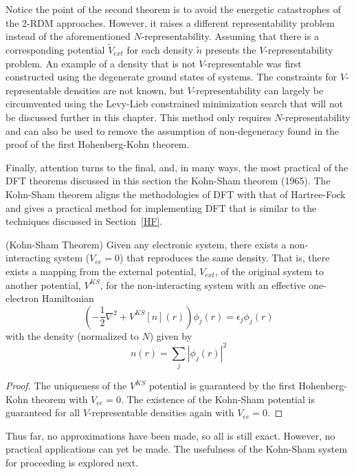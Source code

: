 \documentclass[11pt,oneside,final]{huthesis}%
\begin{document}
Notice the point of the second theorem is to avoid the energetic catastrophes    of the 2-RDM approaches.  However, it raises a different representability problem instead of the aforementioned $N$-representability.  Assuming that there is a corresponding potential $\tilde{V}_{ext}$ for each density $\tilde{n}$ presents the $V$-representability problem.  An example of a density that is not $V$-representable was first constructed using the degenerate ground states of systems.  The constraints for $V$-representable densities are not known, but $V$-representability can largely be circumvented using the Levy-Lieb constrained minimization search that will not be discussed further in this chapter. This method only requires $N$-representability and can also be used to remove the assumption of non-degeneracy found in the proof of the first Hohenberg-Kohn theorem.

Finally, attention turns to the final, and, in many ways, the most practical of the DFT theorems discussed in this section the Kohn-Sham theorem (1965).   The Kohn-Sham theorem aligns the methodologies of DFT with that of Hartree-Fock and gives a practical method for implementing DFT that is similar to the techniques discussed in Section~\ref{HF}.

\begin{theorem}(Kohn-Sham Theorem) Given any electronic system, there exists a non-interacting system ($V_{ee}=0$) that reproduces the same density.  That is, there exists a mapping from the external potential, $V_{ext}$, of the original system to another potential, $V^{KS}$, for the non-interacting system with an effective one-electron Hamiltonian
\begin{equation}
 \left(  -\frac{1}{2}\nabla^2 +V^{KS}[n](r) \right) \phi_j(r)=\epsilon_j\phi_j(r)
\label{eq:vKS}
\end{equation}
 with the density (normalized to $N$) given by 
\begin{equation}\label{eq:n}
n(r)=\sum_j |\phi_j(r)|^2
\end{equation}
\end{theorem}
\begin{proof} The uniqueness of the $V^{KS}$ potential is guaranteed by the first Hohenberg-Kohn theorem with $V_{ee}=0$.   The existence of the Kohn-Sham potential is guaranteed for all $V$-representable densities again with $V_{ee}=0$.\end{proof}

Thus far, no approximations have been made, so all is still exact.  However, no practical applications can yet be made.  The usefulness of the Kohn-Sham system for proceeding is explored next.
\end{document}
